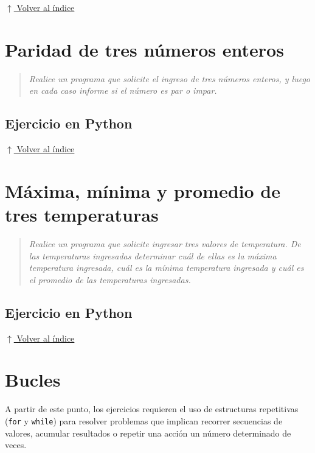 \documentclass[12pt]{article}
\newcommand{\codigopython}[2]{%
}
\newcommand{\volverindice}{%
    \vspace{1em}%
    \begin{flushright}%
        \hyperlink{indice}{\small $\uparrow$ Volver al índice}%
    \end{flushright}%
}
\newcommand{\enunciado}[1]{%
    \begin{quote}
        \itshape #1
    \end{quote}
}
\begin{document}
\codigopython{10}{Diferencia entre dos números: positiva, negativa o cero}

\volverindice
\newpage


\section{Paridad de tres números enteros}

\enunciado{Realice un programa que solicite el ingreso de tres números enteros, y luego en cada caso informe si el número es par o impar.}

\subsection*{Ejercicio en Python}

\codigopython{11}{Paridad de tres números enteros}

\volverindice
\newpage


\section{Máxima, mínima y promedio de tres temperaturas}

\enunciado{Realice un programa que solicite ingresar tres valores de temperatura. De las temperaturas ingresadas determinar cuál de ellas es la máxima temperatura ingresada, cuál es la mínima temperatura ingresada y cuál es el promedio de las temperaturas ingresadas.}

\subsection*{Ejercicio en Python}

\codigopython{12}{Máxima, mínima y promedio de tres temperaturas}

\volverindice


\newpage
{}
\section*{Bucles}

A partir de este punto, los ejercicios requieren el uso de estructuras repetitivas (\texttt{for} y \texttt{while}) para resolver problemas que implican recorrer secuencias de valores, acumular resultados o repetir una acción un número determinado de veces.
\end{document}
